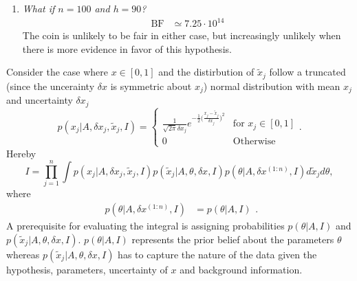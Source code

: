 \begin{example}
\begin{enumerate}
		\item \emph{What if $n=100$ and $h=90$?}
		\begin{equation}
			\begin{split}
				\text{BF}	&\simeq 7.25\cdot 10^{14}
			\end{split}
		\end{equation}
		The coin is unlikely to be fair in either case, but increasingly unlikely when there is more evidence in favor of this hypothesis.
	\end{enumerate}
\end{example}

\begin{example}
	Consider the case where $x \in [0,1]$ and the distirbution of $\tilde{x}_j$ follow a truncated (since the uncerainty $\delta x$ is symmetric about $x_j$) normal distribution with mean $x_j$ and uncertainty $\delta x_j$\label{ex:BF1}
	\begin{equation}
		p(x_j|A,\delta x_j, \tilde{x}_j, I) = \begin{cases}
			\frac{1}{\sqrt{2\pi}\delta x_j}e^{-\frac{1}{2}\big(\frac{x_j-\tilde{x}_j}{\delta x_j}\big)^2} & \text{for  } x_j\in [0,1]\\
			0 & \text{Otherwise} 
		\end{cases}.
	\end{equation} 
	Hereby
	\begin{equation}
		I = \prod_{j=1}^n\int p(x_j|A,\delta x_j, \tilde{x}_j, I)p(\tilde{x}_j|A,\theta,\delta x, I)p(\theta|A,\delta x^{(1:n)},I) d\tilde{x}_j d\theta,
	\end{equation}
	where
	\begin{equation}
		\begin{split}
			p(\theta|A,\delta x^{(1:n)},I)
			& =  p(\theta|A,I)
		\end{split}.
	\end{equation}
	A prerequisite for evaluating the integral is assigning probabilities $p(\theta|A,I)$ and $p(\tilde{x}_j|A,\theta,\delta x, I)$. $p(\theta|A,I)$ represents the prior belief about the parameters $\theta$ whereas $p(\tilde{x}_j|A,\theta,\delta x, I)$ has to capture the nature of the data given the hypothesis, parameters, uncertainty of $x$ and background information. 
	

\end{example}
